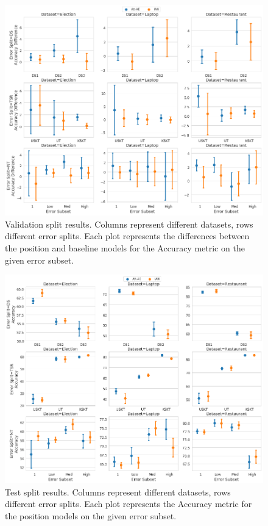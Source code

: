 \begin{figure}[h!]
    \centering
    \includegraphics[scale=0.32]{images/augmentation/methods_performance/Position_Encoding/position_split_difference_validation_results.png}
    \caption{Validation split results. Columns represent different datasets, rows different error splits. Each plot represents the differences between the position and baseline models for the Accuracy metric on the given error subset.}
    \label{fig:aug_position_split_difference_validation_results}
\end{figure}
\begin{figure}[h!]
    \centering
    \includegraphics[scale=0.32]{images/augmentation/methods_performance/Position_Encoding/position_split_overall_test_results.png}
    \caption{Test split results. Columns represent different datasets, rows different error splits. Each plot represents the Accuracy metric for the position models on the given error subset.}
    \label{fig:aug_position_split_overall_test_results}
\end{figure}
